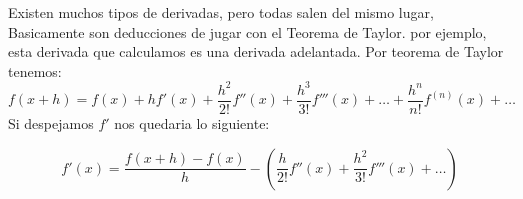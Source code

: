 \documentclass[11pt,a4paper]{article}
\begin{document}
Existen muchos tipos de derivadas, pero todas salen del mismo lugar, Basicamente son deducciones
de jugar con el Teorema de Taylor. por ejemplo, esta derivada que calculamos es una derivada
adelantada.
\bigskip
Por teorema de Taylor tenemos:
\begin{equation}
 f(x+h) = f(x) + hf'(x) + \frac{h^2}{2!}f''(x) + \frac{h^3}{3!}f'''(x) + \dots + \frac{h^n}{n!}f^{(n)}(x) + \dots
\end{equation}
Si despejamos $f'$ nos quedaria lo siguiente:

\begin{equation}
    f'(x) = \frac{f(x+h) - f(x)}{h} - \left( \frac{h}{2!}f''(x) + \frac{h^2}{3!}f'''(x) + \dots \right)
\end{equation}
\end{document}
